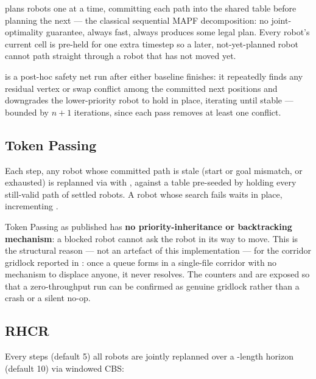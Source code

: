  plans robots one at a time, committing each path into
the shared table before planning the next --- the classical sequential MAPF
decomposition: no joint-optimality guarantee, always fast, always produces some
legal plan. Every robot's current cell is pre-held for one extra timestep so a
later, not-yet-planned robot cannot path straight through a robot that has not
moved yet.

 is a post-hoc safety net run after either
baseline finishes: it repeatedly finds any residual vertex or swap conflict
among the committed next positions and downgrades the lower-priority robot to
hold in place, iterating until stable --- bounded by $n+1$ iterations, since
each pass removes at least one conflict.

\subsection{Token Passing}
\label{sec:baselines-tp}

Each step, any robot whose committed path is stale (start or goal mismatch, or
exhausted) is replanned via  with
, against a table pre-seeded by holding every
still-valid path of settled robots. A robot whose search fails waits in place,
incrementing .

Token Passing as published has \textbf{no priority-inheritance or backtracking
mechanism}: a blocked robot cannot ask the robot in its way to move. This is
the structural reason --- not an artefact of this implementation --- for the
corridor gridlock reported in : once a queue forms
in a single-file corridor with no mechanism to displace anyone, it never
resolves. The counters  and 
are exposed so that a zero-throughput run can be confirmed as genuine gridlock
rather than a crash or a silent no-op.

\subsection{RHCR}
\label{sec:baselines-rhcr}

Every  steps (default 5) all robots are jointly
replanned over a -length horizon (default 10) via
windowed CBS:

